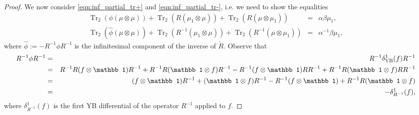 \documentclass[11pt,fleqn]{amsart} %
\DeclareMathOperator{\tr}{Tr}
\begin{document}
\begin{proof}
		
		We now consider \eqref{eqn:inf_partial_tr+} and \eqref{eqn:inf_partial_tr-}, i.e. we need to show the equalities
		\begin{eqnarray*}
				\tr_2(\phi(\mu\otimes \mu)) + \tr_2(R(\mu_1\otimes \mu)) + \tr_2(R(\mu\otimes \mu_1)) &=& \alpha\beta \mu_1 , \\
				\tr_2(\hat\phi(\mu\otimes \mu)) + \tr_2(R^{-1}(\mu_1\otimes \mu)) + \tr_2(R^{-1}(\mu\otimes \mu_1)) &=& \alpha^{-1}\beta \mu_1,
		\end{eqnarray*}
		where $\hat\phi := -R^{-1}\phi R^{-1}$ is the infinitesimal component of the inverse of $\tilde R$. Observe that
		\begin{eqnarray*}
				R^{-1}\phi R^{-1} 
				&=& R^{-1}\delta^1_{\rm YB}(f) R^{-1}   \\
				&=& R^{-1}R(f\otimes \mathbb 1)R^{-1} + R^{-1}R(\mathbb 1\otimes f)R^{-1} - R^{-1}(f\otimes \mathbb 1)RR^{-1} + R^{-1}R(\mathbb 1\otimes f)RR^{-1}\\
				&=& (f\otimes \mathbb 1)R^{-1} + (\mathbb 1\otimes f)R^{-1} - R^{-1}(f\otimes \mathbb 1)+ R^{-1}R(\mathbb 1\otimes f)\\
				&=& - \delta^1_{  R^{-1} } (f),  
		\end{eqnarray*}
		where $\delta^1_{ R^{-1}}(f)$ is the first 
		 YB differential of the operator $R^{-1}$ applied to $f$. 


\end{proof}
\end{document}
